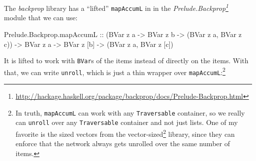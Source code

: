 \documentclass[]{article}
\newenvironment{Shaded}{}{}
\newcommand{\CommentTok}[1]{\textcolor[rgb]{0.38,0.63,0.69}{\textit{#1}}}
\newcommand{\DataTypeTok}[1]{\textcolor[rgb]{0.56,0.13,0.00}{#1}}
\newcommand{\KeywordTok}[1]{\textcolor[rgb]{0.00,0.44,0.13}{\textbf{#1}}}
\newcommand{\NormalTok}[1]{#1}
\newcommand{\OperatorTok}[1]{\textcolor[rgb]{0.40,0.40,0.40}{#1}}
\newcommand{\OtherTok}[1]{\textcolor[rgb]{0.00,0.44,0.13}{#1}}
\renewcommand{\href}[2]{#2\footnote{\url{#1}}}
\begin{document}
The \emph{backprop} library has a ``lifted'' \texttt{mapAccumL} in in the
\emph{\href{http://hackage.haskell.org/package/backprop/docs/Prelude-Backprop.html}{Prelude.Backprop}}
module that we can use:

\begin{Shaded}
\begin{Highlighting}[]
\NormalTok{Prelude.Backprop.mapAccumL}
\OtherTok{    ::}\NormalTok{ (}\DataTypeTok{BVar}\NormalTok{ z a }\OtherTok{{-}\textgreater{}} \DataTypeTok{BVar}\NormalTok{ z b }\OtherTok{{-}\textgreater{}}\NormalTok{ (}\DataTypeTok{BVar}\NormalTok{ z a, }\DataTypeTok{BVar}\NormalTok{ z c))}
    \OtherTok{{-}\textgreater{}} \DataTypeTok{BVar}\NormalTok{ z a}
    \OtherTok{{-}\textgreater{}} \DataTypeTok{BVar}\NormalTok{ z [b]}
    \OtherTok{{-}\textgreater{}}\NormalTok{ (}\DataTypeTok{BVar}\NormalTok{ z a, }\DataTypeTok{BVar}\NormalTok{ z [c])}
\end{Highlighting}
\end{Shaded}

It is lifted to work with \texttt{BVar}s of the items instead of directly on the
items. With that, we can write \texttt{unroll}, which is just a thin wrapper
over \texttt{mapAccumL}:\footnote{In truth, \texttt{mapAccumL} can work with any
  \texttt{Traversable} container, so we really can \texttt{unroll} over any
  \texttt{Traversable} container and not just lists. One of my favorite is the
  sized vectors from the
  \href{http://hackage.haskell.org/package/vector-sized}{vector-sized} library,
  since they can enforce that the network always gets unrolled over the same
  number of items.}

\begin{Shaded}
\end{Shaded}
\end{document}
